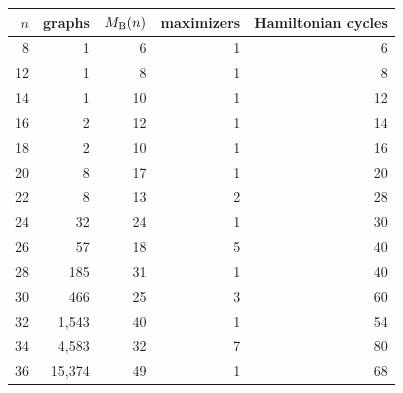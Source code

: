 \begin{tabular}{rrrrr}
\toprule
\(n\) & graphs & \(M_{\mathrm B}(n)\) & maximizers & Hamiltonian cycles \\
\midrule
 8 & 1 & 6 & 1 & 6 \\
12 & 1 & 8 & 1 & 8 \\
14 & 1 & 10 & 1 & 12 \\
16 & 2 & 12 & 1 & 14 \\
18 & 2 & 10 & 1 & 16 \\
20 & 8 & 17 & 1 & 20 \\
22 & 8 & 13 & 2 & 28 \\
24 & 32 & 24 & 1 & 30 \\
26 & 57 & 18 & 5 & 40 \\
28 & 185 & 31 & 1 & 40 \\
30 & 466 & 25 & 3 & 60 \\
32 & 1,543 & 40 & 1 & 54 \\
34 & 4,583 & 32 & 7 & 80 \\
36 & 15,374 & 49 & 1 & 68 \\
\bottomrule
\end{tabular}
